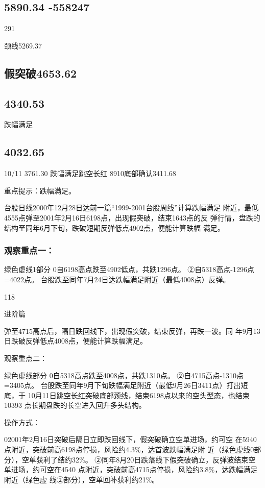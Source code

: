 \documentclass{article}
\begin{document}
\subsection{5890.34 -558247}

291

颈线5269.37

\subsection{假突破4653.62}

\subsection{4340.53}

跌幅满足

\subsection{4032.65}

10/11 3761.30 跌幅满足跳空长红 8910底部确认3411.68

重点提示：跌幅满足。

台股日线2000年12月28日达前一篇“1999-2001台股周线”计算跌幅满足 附近，最低4555点弹至2001年2月16日6198点，出现假突破，结束1643点的反 弹行情，盘跌的结构至同年6月下旬，跌破短期反弹低点4902点，便能计算跌幅 满足。

\subsubsection{观察重点一：}

绿色虚线1部分 0自6198高点跌至4902低点，共跌1296点。 ②自5318高点-1296点=4022点。 台股跌至同年7月24日达跌幅满足附近（最低4008点）反弹。

118

\clearpage

进阶篇

弹至4715高点后，隔日跌回线下，出现假突破，结束反弹，再跌一波。同 年9月13日跌破反弹低点4008点，便能计算跌幅满足。

观察重点二：

绿色虚线部分 0自5318高点跌至4008点，共跌1310点。 ②自4715高点-1310点=3405点。 台股跌至同年9月下旬跌幅满足附近（最低9月26日3411点）打出短底，于 10月11日跳空长红突破底部颈线，结束6198点以来的空头型态，也结束10393 点长期盘跌的长空进入回升多头结构。

操作方式：

02001年2月16日突破后隔日立即跌回线下，假突破确立空单进场，约可空 在5940点附近，突破前高6198点停损，风险约4.3\%，达首波跌幅满足附 近（绿色虚线0部分），空单获利了结约32\%。 ②同年8月20日跌落线下假突破确立，反弹波结束空单进场，约可空在4540 点附近，突破前高4715点停损，风险约3.8\%，达跌幅满足附近（绿色虚 线②部分），空单回补获利约21\%。
\end{document}
